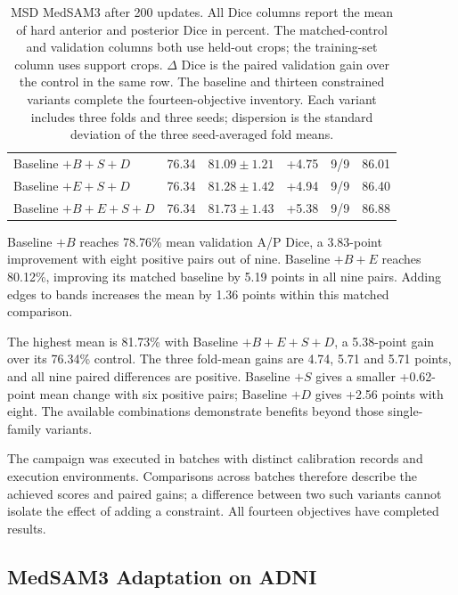 \documentclass[12pt,a4paper]{article}
\begin{document}
\begin{table}[htbp]
\begin{tabular}{@{}lrrrrr@{}}
Baseline $+B+S+D$ & 76.34 & $81.09\pm1.21$ & +4.75 & 9/9 & 86.01 \\
Baseline $+E+S+D$ & 76.34 & $81.28\pm1.42$ & +4.94 & 9/9 & 86.40 \\
Baseline $+B+E+S+D$ & 76.34 & $81.73\pm1.43$ & +5.38 & 9/9 & 86.88 \\
\hline
\end{tabular}
\caption{MSD MedSAM3 after 200 updates. All Dice columns report the
mean of hard anterior and posterior Dice in percent. The matched-control
and validation columns both use held-out crops; the training-set column
uses support crops. $\Delta$ Dice is the paired validation gain over the
control in the same row. The baseline and thirteen constrained variants
complete the fourteen-objective inventory. Each variant includes three
folds and three seeds; dispersion is the standard deviation of the
three seed-averaged fold means.}
\label{tab:medsam-msd-noaug}
\label{tab:medsam-msd-original-noaug}
\end{table}

Baseline $+B$ reaches 78.76\% mean validation A/P Dice, a 3.83-point improvement
with eight positive pairs out of nine. Baseline $+B+E$ reaches 80.12\%,
improving its matched baseline by 5.19 points in all nine pairs.
Adding edges to bands increases the mean by 1.36 points within this
matched comparison.

The highest mean is 81.73\% with Baseline $+B+E+S+D$, a 5.38-point
gain over its 76.34\% control. The three fold-mean gains are 4.74,
5.71 and 5.71 points, and all nine paired differences are positive.
Baseline $+S$ gives a smaller +0.62-point mean change with six positive
pairs; Baseline $+D$ gives +2.56 points with eight. The available
combinations demonstrate benefits beyond those single-family variants.

The campaign was executed in batches with distinct calibration records
and execution environments. Comparisons across batches therefore
describe the achieved scores and paired gains; a difference between two
such variants cannot isolate the effect of adding a constraint.
All fourteen objectives have completed results.

\FloatBarrier
\subsection{MedSAM3 Adaptation on ADNI}
\label{sec:medsam-adni-results}
\end{document}
